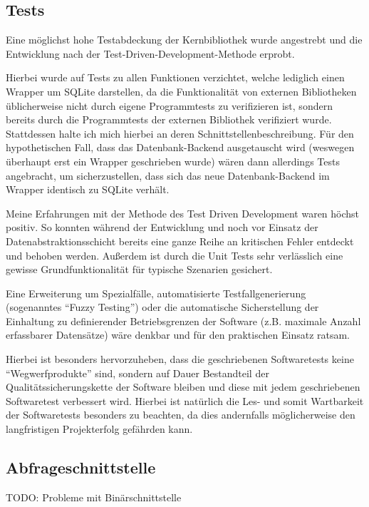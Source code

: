 \subsection{Tests}
Eine möglichst hohe Testabdeckung der Kernbibliothek wurde angestrebt und die Entwicklung nach der
Test-Driven-Development-Methode erprobt.

Hierbei wurde auf Tests zu allen Funktionen verzichtet, welche lediglich einen Wrapper um SQLite darstellen, da die
Funktionalität von externen Bibliotheken üblicherweise nicht durch eigene Programmtests zu verifizieren ist, sondern
bereits durch die Programmtests der externen Bibliothek verifiziert wurde. Stattdessen halte ich mich hierbei an deren
Schnittstellenbeschreibung.
Für den hypothetischen Fall, dass das Datenbank-Backend ausgetauscht wird (weswegen überhaupt erst ein Wrapper
geschrieben wurde) wären dann allerdings Tests angebracht, um sicherzustellen, dass sich das neue Datenbank-Backend im
Wrapper identisch zu SQLite verhält.

Meine Erfahrungen mit der Methode des Test Driven Development waren höchst positiv. So konnten während der Entwicklung
und noch vor Einsatz der Datenabstraktionsschicht bereits eine ganze Reihe an kritischen Fehler entdeckt und behoben werden.
Außerdem ist durch die Unit Tests sehr verlässlich eine gewisse Grundfunktionalität für typische Szenarien gesichert.

Eine Erweiterung um Spezialfälle, automatisierte Testfallgenerierung (sogenanntes ``Fuzzy Testing'') oder die automatische
Sicherstellung der Einhaltung zu definierender Betriebsgrenzen der Software (z.B. maximale Anzahl erfassbarer Datensätze)
wäre denkbar und für den praktischen Einsatz ratsam.

Hierbei ist besonders hervorzuheben, dass die geschriebenen Softwaretests keine ``Wegwerfprodukte'' sind, sondern auf
Dauer Bestandteil der Qualitätssicherungskette der Software bleiben und diese mit jedem geschriebenen Softwaretest
verbessert wird. Hierbei ist natürlich die Les- und somit Wartbarkeit der Softwaretests besonders zu beachten, da dies
andernfalls möglicherweise den langfristigen Projekterfolg gefährden kann.

\subsection{Abfrageschnittstelle}
TODO: Probleme mit Binärschnittstelle

